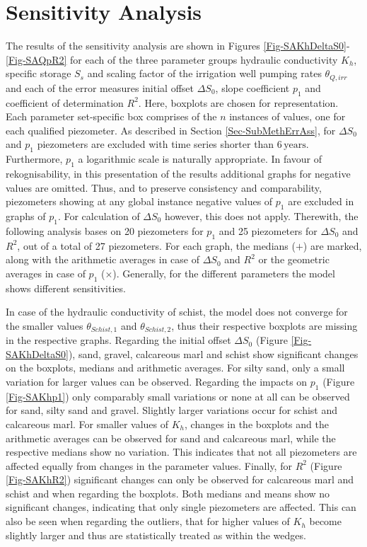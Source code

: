 
\section{Sensitivity Analysis}

The results of the sensitivity analysis are shown in Figures \ref{Fig-SAKhDeltaS0}-\ref{Fig-SAQpR2} for each of the three parameter groups hydraulic conductivity $K_h$, specific storage $S_s$ and scaling factor of the irrigation well pumping rates $\theta_{Q,irr}$ and each of the error measures initial offset $\Delta S_0$, slope coefficient $p_1$ and coefficient of determination $R^2$. 
Here, boxplots are chosen for representation. 
Each parameter set-specific box comprises of the $n$ instances of values, one for each qualified piezometer. 
As described in Section \ref{Sec-SubMethErrAss}, for $\Delta S_0$ and $p_1$ piezometers are excluded with time series shorter than $6 \, \textrm{years}$. 
Furthermore, $p_1$ a logarithmic scale is naturally appropriate. 
In favour of rekognisability, in this presentation of the results additional graphs for negative values are omitted. 
Thus, and to preserve consistency and comparability, piezometers showing at any global instance negative values of $p_1$ are excluded in graphs of $p_1$. 
For calculation of $\Delta S_0$ however, this does not apply. 
Therewith, the following analysis bases on 20 piezometers for $p_1$ and 25 piezometers for $\Delta S_0$ and $R^2$, out of a total of 27 piezometers. 
For each graph, the medians ($\bm{+}$) are marked, along with the arithmetic averages in case of $\Delta S_0$ and $R^2$ or the geometric averages in case of $p_1$ ($\bm{\times}$). 
Generally, for the different parameters the model shows different sensitivities.

In case of the hydraulic conductivity of schist, the model does not converge for the smaller values $\theta_{Schist,1}$ and $\theta_{Schist,2}$, thus their respective boxplots are missing in the respective graphs. 
Regarding the initial offset $\Delta S_0$ (Figure \ref{Fig-SAKhDeltaS0}), sand, gravel, calcareous marl and schist show significant changes on the boxplots, medians and arithmetic averages. 
For silty sand, only a small variation for larger values can be observed. 
Regarding the impacts on $p_1$ (Figure \ref{Fig-SAKhp1}) only comparably small variations or none at all can be observed for sand, silty sand and gravel. 
Slightly larger variations occur for schist and calcareous marl. 
For smaller values of $K_h$, changes in the boxplots and the arithmetic averages can be observed for sand and calcareous marl, while the respective medians show no variation. 
This indicates that not all piezometers are affected equally from changes in the parameter values. 
Finally, for $R^2$ (Figure \ref{Fig-SAKhR2}) significant changes can only be observed for calcareous marl and schist and when regarding the boxplots. 
Both medians and means show no significant changes, indicating that only single piezometers are affected. 
This can also be seen when regarding the outliers, that for higher values of $K_h$ become slightly larger and thus are statistically treated as within the wedges.

